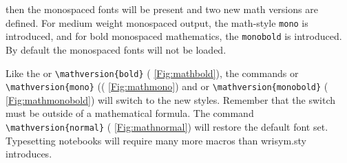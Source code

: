 \documentclass{article}
\begin{document}
\noindent{}then the monospaced fonts will be present and two new math
versions are defined.  For medium weight monospaced output, the
math-style \texttt{mono} is introduced, and for bold monospaced
mathematics, the \texttt{monobold} is introduced.  By default the
monospaced fonts will not be loaded.
\begin{sloppypar}
Like the  or \verb|\mathversion{bold}| (\figurename{}
\ref{Fig:mathbold}), the commands  or
\verb|\mathversion{mono}| ((\figurename{} \ref{Fig:mathmono}) and
 or \verb|\mathversion{monobold}| (\figurename{}
\ref{Fig:mathmonobold}) will switch to the new styles. Remember that
the switch must be outside of a mathematical formula.  The command
\verb|\mathversion{normal}| (\figurename{} \ref{Fig:mathnormal}) will
restore the default font set.  Typesetting notebooks will require many
more macros than \textsf{wrisym.sty} introduces.
\end{sloppypar}

\def\half{\frac{1}{2}}
\end{document}

